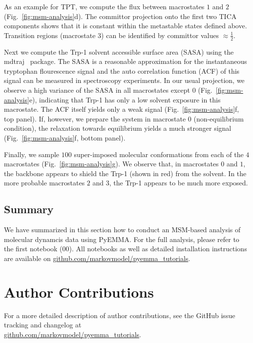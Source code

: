 \documentclass[9pt,tutorial]{livecoms}
\newcommand{\githubrepository}{\url{github.com/markovmodel/pyemma_tutorials}}
\begin{document}
As an example for TPT, we compute the flux between macrostates $1$ and $2$ (Fig.~\ref{fig:msm-analysis}d). The committor projection onto the first two TICA components shows that it is constant within the metastable states defined above. Transition regions (macrostate $3$) can be identified by committor values $\approx \frac{1}{2}$.

Next we compute the Trp-1 solvent accessible surface area (SASA) using the mdtraj~\cite{mdtraj} package. The SASA is a reasonable approximation for the instantaneous tryptophan flourescence signal and the auto correlation function (ACF) of this signal can be measured in spectroscopy experiments. In our usual projection, we observe a high variance of the SASA in all macrostates except $0$ (Fig.~\ref{fig:msm-analysis}e), indicating that Trp-1 has only a low solvent exposure in this macrostate. The ACF itself yields only a weak signal (Fig.~\ref{fig:msm-analysis}f, top panel). If, however, we prepare the system in macrostate $0$ (non-equilibrium condition), the relaxation towards equilibrium yields a much stronger signal (Fig.~\ref{fig:msm-analysis}f, bottom panel).

Finally, we sample $100$ super-imposed molecular conformations from each of the $4$ macrostates (Fig.~\ref{fig:msm-analysis}g). We observe that, in macrostates $0$ and $1$, the backbone appears to shield the Trp-1 (shown in red) from the solvent. In the more probable macrostates $2$ and $3$, the Trp-1 appears to be much more exposed.

\subsection{Summary}

We have summarized in this section how to conduct an MSM-based analysis of molecular dynamcis data using PyEMMA. For the full analysis, please refer to the first notebook (00). All notebooks as well as detailed installation instructions are available on \githubrepository{}.

\section{Author Contributions}
%
For a more detailed description of author contributions, see the GitHub issue tracking and changelog at\\\githubrepository{}.
\end{document}

